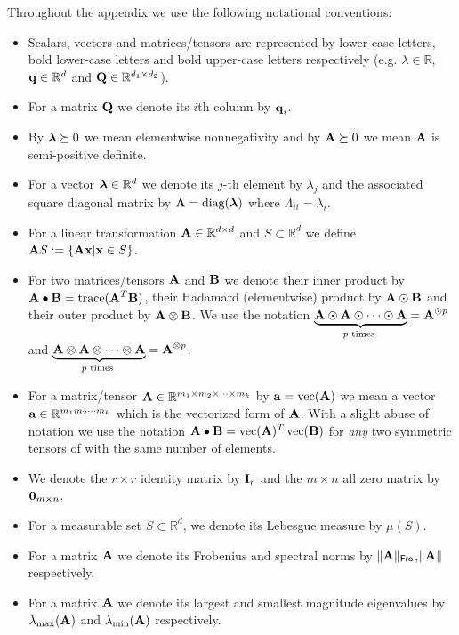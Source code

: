 \documentclass[11pt]{article}
\theoremstyle{plain}
\DeclareMathOperator*{\diag}{diag}
\DeclareMathOperator*{\vectorize}{vec}
\DeclareMathOperator*{\trace}{trace}
\def\R{\mathbb{R}}
\theoremstyle{plain}
\numberwithin{equation}{section}
\numberwithin{lemma}{section}
\numberwithin{theorem}{section}
\numberwithin{corollary}{section}
\numberwithin{observation}{section}
\numberwithin{definition}{section}
\numberwithin{example}{section}
\begin{document}
Throughout the appendix we use the following notational conventions: 
\begin{itemize}
    \item Scalars, vectors and matrices/tensors are represented by lower-case letters, bold lower-case letters and bold upper-case letters respectively (e.g. $\lambda \in \R$, $\V{q} \in \R^d$ and $\Mx{Q}\in \R^{d_1 \times d_2}$).
    \item For a matrix $\Mx{Q}$ we denote its $i$th column by $\V{q}_i$.
\item By $\V{\lambda} \succeq 0$ we mean elementwise nonnegativity and by $\Mx{A} \succeq 0$ we mean $\Mx{A}$ is semi-positive definite.
    \item For a vector $\V{\lambda} \in \R^d$ we denote its $j$-th element by $\lambda_j$ and the associated square diagonal matrix by $\Mx{\Lambda} = \diag(\V{\lambda})$ where $\Lambda_{ii} = \lambda_i$. 
    \item For a linear transformation $\Mx{A}\in \R^{d \times d}$ and $S \subset \R^d$ we define $\Mx{A}S:= \{\Mx{A}\V{x}|\V{x} \in S\}$.
    \item For two matrices/tensors $\Mx{A}$ and $\Mx{B}$  we denote their inner product by $\Mx{A} \bullet \Mx{B} = \trace(\Mx{A}^T\Mx{B})$, their Hadamard (elementwise) product by $\Mx{A} \odot \Mx{B}$ and their outer product by $\Mx{A} \otimes \Mx{B}$. We use the notation $\underbrace{\Mx{A} \odot \Mx{A} \odot \cdots \odot \Mx{A}}_{p \text{ times }} = \Mx{A}^{\odot p}$ and $\underbrace{\Mx{A} \otimes \Mx{A} \otimes \cdots \otimes \Mx{A}}_{p \text{ times }} = \Mx{A}^{\otimes p}$.
    \item For a matrix/tensor $\Mx{A} \in \R^{m_1 \times m_2 \times \cdots \times m_k}$ by $\V{a} = \vectorize(\Mx{A})$ we mean a vector $\V{a} \in \R^{m_1m_2\cdots m_k}$ which is the vectorized form of $\Mx{A}$. With a slight abuse of notation we use the notation $\Mx{A}\bullet \Mx{B} = \vectorize(\Mx{A}) ^T \vectorize(\Mx{B})$ for \textit{any} two symmetric tensors of with the same number of elements.

    
    
    \item We denote the $r \times r$ identity matrix by $\Mx{I}_r$ and the $m \times n$ all zero matrix by $\Mx{0}_{m \times n}$.
    \item For a measurable set $S \subset \R^d$, we denote its Lebesgue measure by $\mu(S)$.
    \item For a matrix $\Mx{A}$ we denote its Frobenius and spectral norms by $\| \Mx{A} \|_{\sf Fro}$,$\| \Mx{A} \|$ respectively.
    \item For a matrix $\Mx{A}$ we denote its largest and smallest magnitude eigenvalues by $\lambda_{\max}(\Mx{A})$ and $\lambda_{\min}(\Mx{A})$ respectively.

    
    
\end{itemize}
\end{document}
